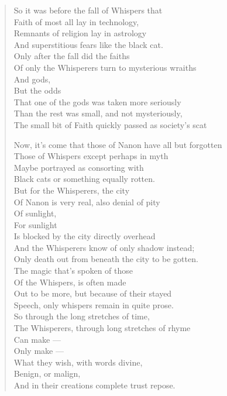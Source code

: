 \begin{paracol}{2}
\begin{leftcolumn}
\begin{verse}
So it was before the fall of Whispers that\\
\vin Faith of most all lay in technology,\\
\vin Remnants of religion lay in astrology\\
And superstitious fears like the black cat.\\
\vin Only after the fall did the faiths\\
\vin Of only the Whisperers turn to mysterious wraiths\\
\vin \vin And gods,\\
\vin \vin But the odds\\
\vin That one of the gods was taken more seriously\\
\vin Than the rest was small, and not mysteriously,\\
The small bit of Faith quickly passed as society's scat

Now, it's come that those of Nanon have all but forgotten\\
\vin Those of Whispers except perhaps in myth\\
\vin Maybe portrayed as consorting with\\
Black cats or something equally rotten.\\
\vin But for the Whisperers, the city\\
\vin Of Nanon is very real, also denial of pity\\
\vin \vin Of sunlight,\\
\vin \vin For sunlight\\
\vin Is blocked by the city directly overhead\\
\vin And the Whisperers know of only shadow instead;\\
Only death out from beneath the city to be gotten.\\

The magic that's spoken of those\\
\vin Of the Whispers, is often made\\
\vin Out to be more, but because of their stayed\\
Speech, only whispers remain in quite prose.\\
\vin So through the long stretches of time,\\
\vin The Whisperers, through long stretches of rhyme\\
\vin \vin Can make ---\\
\vin \vin Only make ---\\
\vin What they wish, with words divine,\\
\vin Benign, or malign,\\
And in their creations complete trust repose.


\end{verse}
\end{leftcolumn}
\end{paracol}
